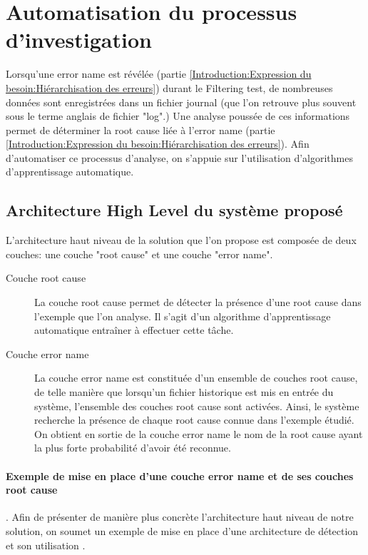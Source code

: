 \chapter{Automatisation du processus d'investigation}
\label{Automatisation du processus d'investigation}
\thispagestyle{fancy}
Lorsqu'une error name est révélée (partie \ref{Introduction:Expression du besoin:Hiérarchisation des erreurs}) durant le Filtering test, de nombreuses données sont enregistrées dans un fichier journal (que l'on retrouve plus souvent sous le terme anglais de fichier "log".) Une analyse poussée de ces informations permet de déterminer la root cause liée à l'error name (partie \ref{Introduction:Expression du besoin:Hiérarchisation des erreurs}). Afin d'automatiser ce processus d'analyse, on s'appuie sur l'utilisation d'algorithmes d'apprentissage automatique. 

\section{Architecture High Level du système proposé}
\label{Automatisation du processus d'investigation: Achitecture High Level du système proposé}
L'architecture haut niveau de la solution que l'on propose est composée de deux couches: une couche "root cause" et une couche "error name".
\begin{description}
	\item [Couche root cause] La couche root cause permet de détecter la présence d'une root cause dans l'exemple que l'on analyse. Il s'agit d'un algorithme d'apprentissage automatique entraîner à effectuer cette tâche.
	\item [Couche error name] La couche error name est constituée d'un ensemble de couches root cause, de telle manière que lorsqu'un fichier historique est mis en entrée du système, l'ensemble des couches root cause sont activées. Ainsi, le système recherche la présence de chaque root cause connue dans l'exemple étudié. On obtient en sortie de la couche error name le nom de la root cause ayant la plus forte probabilité d'avoir été reconnue.
\end{description} 

\subsubsection{Exemple de mise en place  d'une couche error name et de ses couches root cause}.
Afin de présenter de manière plus concrète l'architecture  haut niveau de notre solution, on soumet un exemple de mise en place d'une architecture de détection et son utilisation . \\

